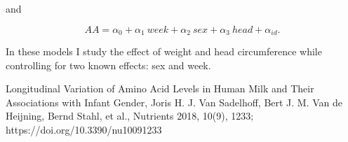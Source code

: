 \documentclass[12pt]{article}
\begin{document}
and

\begin{equation} \label{eq:model5}
  AA = \alpha_0 + \alpha_1 \ week + \alpha_2 \ sex + \alpha_3 \ head + \alpha_{id}.
\end{equation}

In these models I study the effect of weight and head circumference while controlling for two known effects: sex and week.

\newpage



\begin{thebibliography}{1}

 Longitudinal Variation of Amino Acid Levels in Human Milk and Their Associations with Infant Gender, Joris H. J. Van Sadelhoff, Bert J. M. Van de Heijning, Bernd Stahl, et al., Nutrients 2018, 10(9), 1233; https://doi.org/10.3390/nu10091233


\end{thebibliography}
\end{document}
